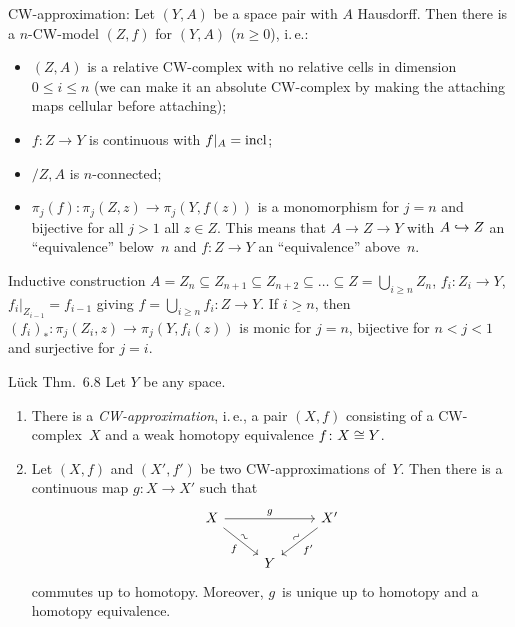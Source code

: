 \documentclass[language=english]{TemplateLecture}
\begin{document}
CW-approximation: Let \((Y,A)\) be a space pair with \(A\) Hausdorff.
Then there is a \(n\)-CW-model \((Z,f)\) for \((Y,A)\) (\(n \ge 0\)), i.\,e.:
\begin{itemize}
    \item \((Z,A)\) is a relative CW-complex with no relative cells in dimension \(0 \le i \le n\) (we can make it an absolute CW-complex by making the attaching maps cellular before attaching);
    \item \(f \colon Z \to Y\) is continuous with \(f|_A = \operatorname{incl}\);
    \item \(/Z,A\)   is \(n\)-connected;
    \item \(\pi_j(f) \colon \pi_j(Z,z) \to \pi_j(Y, f(z))\) is a monomorphism for \(j = n\) and bijective for all \(j > 1\) all \(z \in Z\).
        This means that \(A \to Z \to Y\) with \(A \hookrightarrow Z\) an \enquote{equivalence} below~\(n\) and \(f \colon Z \to Y\) an \enquote{equivalence} above~\(n\).
\end{itemize}

Inductive construction \(A = Z_n \subseteq Z_{n+1} \subseteq Z_{n+2} \subseteq \dots \subseteq Z = \bigcup_{i \ge n} Z_n\), \(f_i \colon Z_i \to Y\), \(f_i|_{Z_{i-1}} = f_{i-1}\) giving \(f = \bigcup_{i \ge n} f_i \colon Z \to Y\).
If \(\underline{i > n}\), then \((f_i)_* \colon \pi_j(Z_i, z) \to \pi_j(Y, f_i(z))\) is monic for \(j = n\), bijective for \(n < j < 1\) and surjective for \(j = i\).
\fi

\begin{thm}{Lück Thm.~6.8}{}
    Let \(Y\) be any space.
    \begin{enumerate}
        \item There is a \emph{CW-approximation}, i.\,e., a pair \((X,f)\) consisting of a CW-complex~\(X\) and a weak homotopy equivalence \(f \colon X \cong Y\).
        \item Let \((X,f)\) and \((X',f')\) be two CW-approximations of~\(Y\).
            Then there is a continuous map \(g \colon X \to X'\) such that
            \begin{equation*}
                \begin{tikzcd}
                    X \ar[rr, "g"] \ar[dr, "f"', "\sim" sloped]
                    && X' \ar[dl, "f'", "\sim" sloped] \\
                    & Y
                \end{tikzcd}
            \end{equation*}
            commutes up to homotopy.
            Moreover, \(g\)~is unique up to homotopy and a homotopy equivalence.
    \end{enumerate}
\end{thm}
\end{document}
